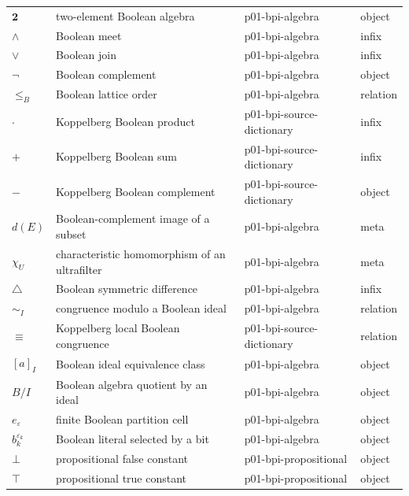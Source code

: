 \begin{longtable}{@{}p{}p{}p{}p{}@{}}
\(\mathbf2\) & two-element Boolean algebra & p01-\allowbreak{}bpi-\allowbreak{}algebra & object \\
\(\wedge\) & Boolean meet & p01-\allowbreak{}bpi-\allowbreak{}algebra & infix \\
\(\vee\) & Boolean join & p01-\allowbreak{}bpi-\allowbreak{}algebra & infix \\
\(\neg\) & Boolean complement & p01-\allowbreak{}bpi-\allowbreak{}algebra & object \\
\(\leq_B\) & Boolean lattice order & p01-\allowbreak{}bpi-\allowbreak{}algebra & relation \\
\(\cdot\) & Koppelberg Boolean product & p01-\allowbreak{}bpi-\allowbreak{}source-\allowbreak{}dictionary & infix \\
\(+\) & Koppelberg Boolean sum & p01-\allowbreak{}bpi-\allowbreak{}source-\allowbreak{}dictionary & infix \\
\(-\) & Koppelberg Boolean complement & p01-\allowbreak{}bpi-\allowbreak{}source-\allowbreak{}dictionary & object \\
\(d(E)\) & Boolean-complement image of a subset & p01-\allowbreak{}bpi-\allowbreak{}algebra & meta \\
\(\chi_U\) & characteristic homomorphism of an ultrafilter & p01-\allowbreak{}bpi-\allowbreak{}algebra & meta \\
\(\triangle\) & Boolean symmetric difference & p01-\allowbreak{}bpi-\allowbreak{}algebra & infix \\
\(\sim_I\) & congruence modulo a Boolean ideal & p01-\allowbreak{}bpi-\allowbreak{}algebra & relation \\
\(\equiv\) & Koppelberg local Boolean congruence & p01-\allowbreak{}bpi-\allowbreak{}source-\allowbreak{}dictionary & relation \\
\([a]_I\) & Boolean ideal equivalence class & p01-\allowbreak{}bpi-\allowbreak{}algebra & object \\
\(B/I\) & Boolean algebra quotient by an ideal & p01-\allowbreak{}bpi-\allowbreak{}algebra & object \\
\(e_\varepsilon\) & finite Boolean partition cell & p01-\allowbreak{}bpi-\allowbreak{}algebra & object \\
\(b_k^{\varepsilon_k}\) & Boolean literal selected by a bit & p01-\allowbreak{}bpi-\allowbreak{}algebra & object \\
\(\bot\) & propositional false constant & p01-\allowbreak{}bpi-\allowbreak{}propositional & object \\
\(\top\) & propositional true constant & p01-\allowbreak{}bpi-\allowbreak{}propositional & object \\

\end{longtable}
